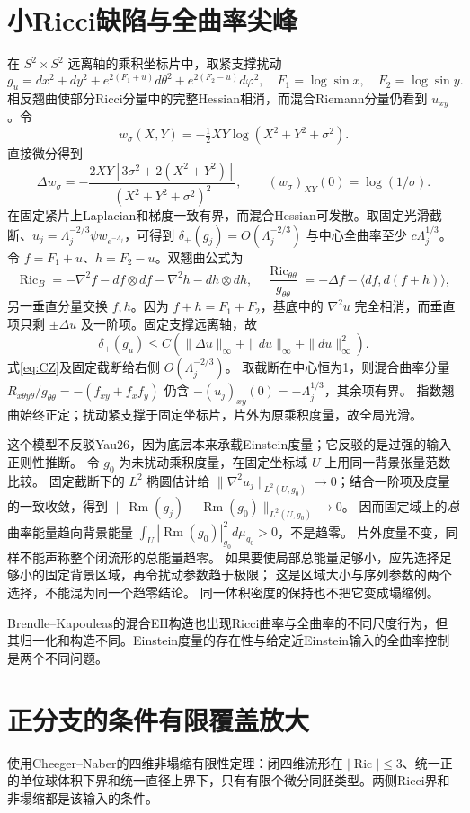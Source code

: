 \documentclass[UTF8,a4paper,11pt,fontset=fandol]{ctexart}
\numberwithin{equation}{section}
\theoremstyle{definition}
\newcommand{\Ric}{\operatorname{Ric}}
\newcommand{\Rm}{\operatorname{Rm}}
\begin{document}
\section{小Ricci缺陷与全曲率尖峰}
在 $S^2\times S^2$ 远离轴的乘积坐标片中，取紧支撑扰动
\[
g_u=dx^2+dy^2+e^{2(F_1+u)}d\theta^2+e^{2(F_2-u)}d\varphi^2,
\quad F_1=\log\sin x,\quad F_2=\log\sin y.
\]
相反翘曲使部分Ricci分量中的完整Hessian相消，而混合Riemann分量仍看到 $u_{xy}$。令
\[
w_\sigma(X,Y)=-\tfrac12XY\log(X^2+Y^2+\sigma^2).
\]
直接微分得到
\begin{equation}\label{eq:CZ}
\Delta w_\sigma=-\frac{2XY[3\sigma^2+2(X^2+Y^2)]}{(X^2+Y^2+\sigma^2)^2},
\qquad (w_\sigma)_{XY}(0)=\log(1/\sigma).
\end{equation}
在固定紧片上Laplacian和梯度一致有界，而混合Hessian可发散。取固定光滑截断、$u_j=\Lambda_j^{-2/3}\psi w_{e^{-\Lambda_j}}$，可得到 $\delta_+(g_j)=O(\Lambda_j^{-2/3})$ 与中心全曲率至少 $c\Lambda_j^{1/3}$。令 $f=F_1+u$、$h=F_2-u$。双翘曲公式为
\[
\Ric_B=-\nabla^2f-df\otimes df-\nabla^2h-dh\otimes dh,\quad
\frac{\Ric_{\theta\theta}}{g_{\theta\theta}}
=-\Delta f-\langle df,d(f+h)\rangle,
\]
另一垂直分量交换 $f,h$。因为 $f+h=F_1+F_2$，基底中的 $\nabla^2u$ 完全相消，而垂直项只剩 $\pm\Delta u$ 及一阶项。固定支撑远离轴，故
\[
\delta_+(g_u)\le C(\|\Delta u\|_\infty+\|du\|_\infty+\|du\|_\infty^2).
\]
式\eqref{eq:CZ}及固定截断给右侧 $O(\Lambda_j^{-2/3})$。
取截断在中心恒为1，则混合曲率分量
$R_{x\theta y\theta}/g_{\theta\theta}
=-(f_{xy}+f_xf_y)$ 仍含
$-(u_j)_{xy}(0)=-\Lambda_j^{1/3}$，其余项有界。
指数翘曲始终正定；扰动紧支撑于固定坐标片，片外为原乘积度量，故全局光滑。

这个模型不反驳Yau26，因为底层本来承载Einstein度量；它反驳的是过强的输入正则性推断。
令 $g_0$ 为未扰动乘积度量，在固定坐标域 $U$ 上用同一背景张量范数比较。
固定截断下的 $L^2$ 椭圆估计给
$\|\nabla^2u_j\|_{L^2(U,g_0)}\to0$；结合一阶项及度量的一致收敛，得到
$\|\Rm(g_j)-\Rm(g_0)\|_{L^2(U,g_0)}\to0$。
因而固定域上的\emph{总}曲率能量趋向背景能量
$\int_U|\Rm(g_0)|_{g_0}^2d\mu_{g_0}>0$，不是趋零。
片外度量不变，同样不能声称整个闭流形的总能量趋零。
如果要使局部总能量足够小，应先选择足够小的固定背景区域，再令扰动参数趋于极限；
这是区域大小与序列参数的两个选择，不能混为同一个趋零结论。
同一体积密度的保持也不把它变成塌缩例。

Brendle--Kapouleas的混合EH构造也出现Ricci曲率与全曲率的不同尺度行为\cite{BK}，但其归一化和构造不同。Einstein度量的存在性与给定近Einstein输入的全曲率控制是两个不同问题。

\section{正分支的条件有限覆盖放大}\label{sec:coveramplifier}
使用Cheeger--Naber的四维非塌缩有限性定理\cite[Theorem 1.12]{CN}：闭四维流形在 $|\Ric|\le3$、统一正的单位球体积下界和统一直径上界下，只有有限个微分同胚类型。两侧Ricci界和非塌缩都是该输入的条件。
\end{document}
